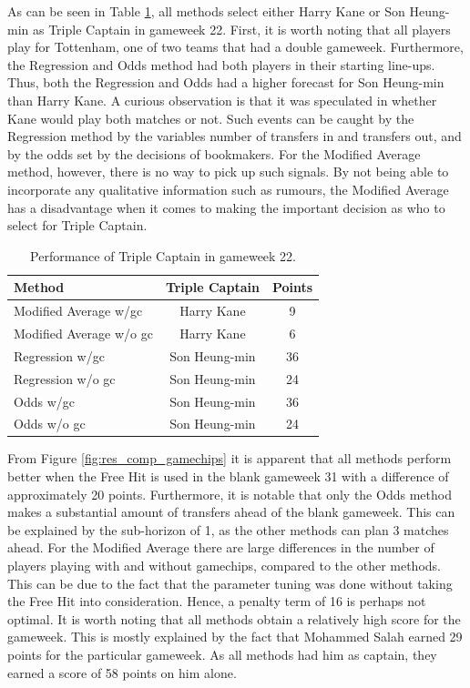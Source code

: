 As can be seen in Table \ref{tab:performance_triple_captain}, all methods select either Harry Kane or Son Heung-min as Triple Captain in gameweek 22. First, it is worth noting that all players play for Tottenham, one of two teams that had a double gameweek. Furthermore, the Regression and Odds method had both players in their starting line-ups. Thus, both the Regression and Odds had a higher forecast for Son Heung-min than Harry Kane. A curious observation is that it was speculated in whether Kane would play both matches or not. Such events can be caught by the Regression method by the variables number of transfers in and transfers out, and by the odds set by the decisions of bookmakers. For the Modified Average method, however, there is no way to pick up such signals. By not being able to incorporate any qualitative information such as rumours, the Modified Average has a disadvantage when it comes to making the important decision as who to select for Triple Captain.

\begin{table}[H]
\centering
\begin{tabular}{@{}lcc@{}}
\toprule
                 Method       & Triple Captain & Points \\ \midrule
Modified Average w/gc   & Harry Kane           & 9      \\
Modified Average w/o gc & Harry Kane           & 6      \\
Regression w/gc         & Son Heung-min            & 36     \\
Regression w/o gc       & Son Heung-min            & 24     \\
Odds w/gc               & Son Heung-min            & 36     \\
Odds w/o gc             & Son Heung-min            & 24     \\ \bottomrule
\end{tabular}
\caption{Performance of Triple Captain in gameweek 22.}
\label{tab:performance_triple_captain}
\end{table}

\newpar 

From Figure \ref{fig:res_comp_gamechips} it is apparent that all methods perform better when the Free Hit is used in the blank gameweek 31 with a difference of approximately 20 points. Furthermore, it is notable that only the Odds method makes a substantial amount of transfers ahead of the blank gameweek. This can be explained by the sub-horizon of 1, as the other methods can plan 3 matches ahead. For the Modified Average there are large differences in the number of players playing with and without gamechips, compared to the other methods. 
This can be due to the fact that the parameter tuning was done without taking the Free Hit into consideration. Hence, a penalty term of 16 is perhaps not optimal. It is worth noting that all methods obtain a relatively high score for the gameweek. This is mostly explained by the fact that Mohammed Salah earned 29 points for the particular gameweek. As all methods had him as captain, they earned a score of 58 points on him alone.


